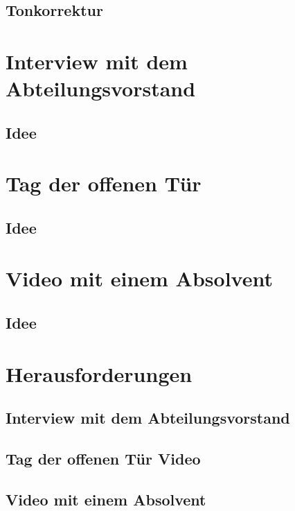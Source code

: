 \subsection{Tonkorrektur}

\section{Interview mit dem Abteilungsvorstand}
\subsection{Idee}
 
\section{Tag der offenen Tür}
\subsection{Idee}

\section{Video mit einem Absolvent}
\subsection{Idee}

\section{Herausforderungen}
\subsection{Interview mit dem Abteilungsvorstand}
\subsection{Tag der offenen Tür Video}
\subsection{Video mit einem Absolvent}


